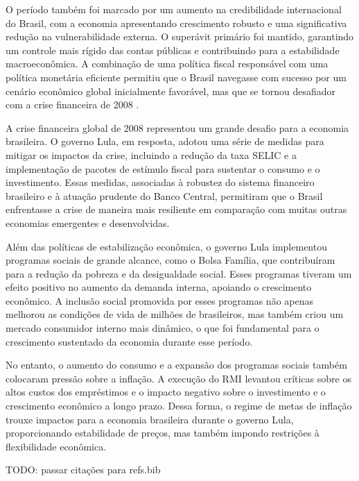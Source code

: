 \documentclass[12pt,oneside,a4paper,chapter=TITLE,english,brazil,sumario=abnt-6027-2012]{abntex2}
\begin{document}
O período também foi marcado por um aumento na credibilidade internacional do Brasil, com a economia apresentando crescimento robusto e uma significativa redução na vulnerabilidade externa. O superávit primário foi mantido, garantindo um controle mais rígido das contas públicas e contribuindo para a estabilidade macroeconômica. A combinação de uma política fiscal responsável com uma política monetária eficiente permitiu que o Brasil navegasse com sucesso por um cenário econômico global inicialmente favorável, mas que se tornou desafiador com a crise financeira de 2008 \cite{fabiogiambiagi_2016_economia}.

A crise financeira global de 2008 representou um grande desafio para a economia brasileira. O governo Lula, em resposta, adotou uma série de medidas para mitigar os impactos da crise, incluindo a redução da taxa SELIC e a implementação de pacotes de estímulo fiscal para sustentar o consumo e o investimento. Essas medidas, associadas à robustez do sistema financeiro brasileiro e à atuação prudente do Banco Central, permitiram que o Brasil enfrentasse a crise de maneira mais resiliente em comparação com muitas outras economias emergentes e desenvolvidas.

Além das políticas de estabilização econômica, o governo Lula implementou programas sociais de grande alcance, como o Bolsa Família, que contribuíram para a redução da pobreza e da desigualdade social. Esses programas tiveram um efeito positivo no aumento da demanda interna, apoiando o crescimento econômico. A inclusão social promovida por esses programas não apenas melhorou as condições de vida de milhões de brasileiros, mas também criou um mercado consumidor interno mais dinâmico, o que foi fundamental para o crescimento sustentado da economia durante esse período.

No entanto, o aumento do consumo e a expansão dos programas sociais também colocaram pressão sobre a inflação. A execução do RMI levantou críticas sobre os altos custos dos empréstimos e o impacto negativo sobre o investimento e o crescimento econômico a longo prazo. Dessa forma, o regime de metas de inflação trouxe impactos para a economia brasileira durante o governo Lula, proporcionando estabilidade de preços, mas também impondo restrições à flexibilidade econômica.

TODO: passar citações para refs.bib
\end{document}
